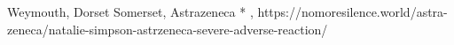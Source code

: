           {Weymouth, Dorset Somerset, }
          {}
          {Astrazeneca}
          {*}
          {
            ,
          }
          {https://nomoresilence.world/astra-zeneca/natalie-simpson-astrzeneca-severe-adverse-reaction/}

